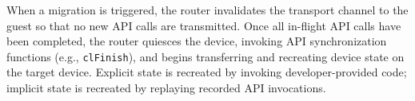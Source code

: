 When a migration is triggered, the router invalidates the transport channel to the guest so that no new API calls are transmitted. Once all in-flight API calls have been completed, the router quiesces the device, invoking API synchronization functions (e.g., \lstinline|clFinish|), and begins transferring and recreating device state on the target device.
Explicit state is recreated by invoking developer-provided code; implicit state is recreated by replaying recorded API invocations.


\begin{comment}
\aak{commented this out because it's an important limitation but too in the weeds}
Because the hypervisor waits for in-fight API invocations to be completed before migration, a potential challenge arises for invocations that take a long time (e.g., an application using persistent threads~\cite{persistent-threads}).
\Model could provide a method to abort such invocations, which, combined with \model's record-replay approach, ensures that device state can be restored to match the state before the invocation.
However, rolling host application state back to match that pre-invocation GPU state requires frequent checkpointing that \model does not yet implement.
We leave this challenge for future work, but observe that compared to current solutions which provide \emph{no} support for VM migration for GPGPU applications, \model provides a compelling level of support.
\end{comment}




